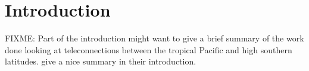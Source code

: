 \section{Introduction}

FIXME: Part of the introduction might want to give a brief summary of the work done looking at teleconnections between the tropical Pacific and high southern latitudes. \citet{Ciasto2015} give a nice summary in their introduction.